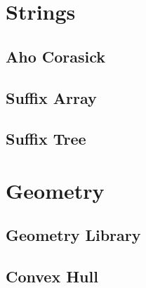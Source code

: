 \section{Strings}
\subsection{Aho Corasick}
\raggedbottom
\hrulefill
\subsection{Suffix Array}
\raggedbottom
\hrulefill
\subsection{Suffix Tree}
\raggedbottom
\hrulefill

\section{Geometry}
\subsection{Geometry Library}
\raggedbottom
\hrulefill
\subsection{Convex Hull}
\raggedbottom
\hrulefill

